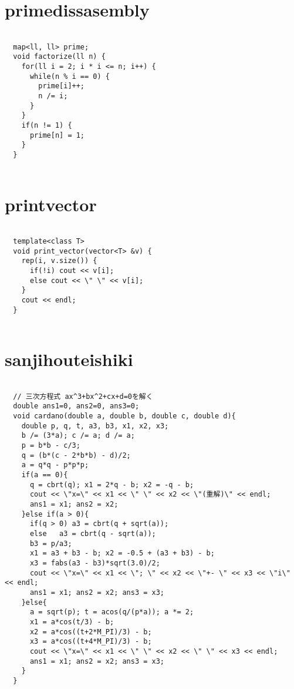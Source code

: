 \documentclass{jsarticle}
\begin{document}
\color{white}
\section{primedissasembly}
\color{black}
\begin{lstlisting}[caption=primedissasembly]

  map<ll, ll> prime;
  void factorize(ll n) {
    for(ll i = 2; i * i <= n; i++) {
      while(n % i == 0) {
        prime[i]++;
        n /= i;
      }
    }
    if(n != 1) {
      prime[n] = 1;
    }
  }
  

\end{lstlisting}

\color{white}
\section{printvector}
\color{black}
\begin{lstlisting}[caption=printvector]

  template<class T>
  void print_vector(vector<T> &v) {
    rep(i, v.size()) {
      if(!i) cout << v[i];
      else cout << \" \" << v[i];
    }
    cout << endl;
  }
  

\end{lstlisting}

\color{white}
\section{sanjihouteishiki}
\color{black}
\begin{lstlisting}[caption=sanjihouteishiki]

  // 三次方程式 ax^3+bx^2+cx+d=0を解く 
  double ans1=0, ans2=0, ans3=0;
  void cardano(double a, double b, double c, double d){
    double p, q, t, a3, b3, x1, x2, x3;
    b /= (3*a); c /= a; d /= a;
    p = b*b - c/3;
    q = (b*(c - 2*b*b) - d)/2;
    a = q*q - p*p*p;
    if(a == 0){
      q = cbrt(q); x1 = 2*q - b; x2 = -q - b;
      cout << \"x=\" << x1 << \" \" << x2 << \"(重解)\" << endl;
      ans1 = x1; ans2 = x2;
    }else if(a > 0){
      if(q > 0) a3 = cbrt(q + sqrt(a));
      else   a3 = cbrt(q - sqrt(a));
      b3 = p/a3;
      x1 = a3 + b3 - b; x2 = -0.5 + (a3 + b3) - b;
      x3 = fabs(a3 - b3)*sqrt(3.0)/2;
      cout << \"x=\" << x1 << \"; \" << x2 << \"+- \" << x3 << \"i\" << endl;
      ans1 = x1; ans2 = x2; ans3 = x3;
    }else{
      a = sqrt(p); t = acos(q/(p*a)); a *= 2;
      x1 = a*cos(t/3) - b;
      x2 = a*cos((t+2*M_PI)/3) - b;
      x3 = a*cos((t+4*M_PI)/3) - b;
      cout << \"x=\" << x1 << \" \" << x2 << \" \" << x3 << endl;
      ans1 = x1; ans2 = x2; ans3 = x3;
    }
  }
  

\end{lstlisting}
\end{document}
